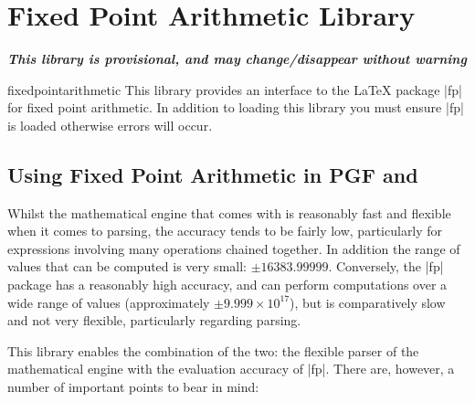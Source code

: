 %
%
%


\section{Fixed Point Arithmetic Library}

{\bf\emph{This library is provisional, and may change/disappear without warning}}

\begin{pgflibrary}{fixedpointarithmetic}
  This library provides an interface to the \LaTeX{} package 
  |fp| for fixed point arithmetic. 	In addition to loading this 
  library you must ensure |fp| is loaded otherwise errors
  will occur. 
\end{pgflibrary}

\subsection{Using Fixed Point Arithmetic in PGF and \tikzname}

  Whilst the mathematical engine that comes with \pgfname{} is 
  reasonably fast and flexible when it comes to parsing, the accuracy
  tends to be fairly low, particularly for expressions involving many 
  operations chained together. In addition the range of values that
  can be computed is very small: $\pm16383.99999$.
	Conversely, the |fp| package has a reasonably high accuracy, and 
	can	perform computations over a wide range of 
	values (approximately $\pm9.999\times10^{17}$), but is comparatively 
	slow and not very 
	flexible, particularly regarding parsing.
  
  This library enables the combination of the two: the flexible parser 
  of the \pgfname{} mathematical engine with the evaluation accuracy 
  of |fp|. There are, however, a number of important points to
  bear in mind: 

